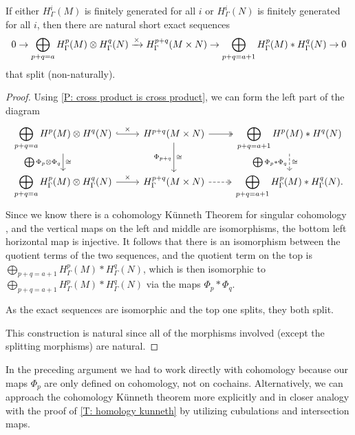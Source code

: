 \begin{theorem}\label{T: cohomology kunneth}
	If either $H^i_\Gamma(M)$ is finitely generated for all $i$ or $H^i_\Gamma(N)$ is finitely generated for all $i$, then there are natural short exact sequences
	\[
	0 \to \bigoplus_{p+q = a}H^p_\Gamma(M) \otimes H^q_\Gamma(N) \xrightarrow{\times} H^{p+q}_\Gamma(M \times N) \to \bigoplus_{p+q = a+1}H^p_\Gamma(M)* H^q_\Gamma(N) \to 0
	\]
	that split (non-naturally).
\end{theorem}

\begin{proof}
	Using \cref{P: cross product is cross product}, we can form the left part of the diagram
	\[
	\begin{tikzcd}
	\displaystyle\bigoplus_{p+q = a}H^p(M) \otimes H^q(N) \arrow[r,"\times",hook]\arrow[d,"\bigoplus \Phi_p \otimes \Phi_q"',"\cong"]& H^{p+q}(M \times N) \arrow[r,twoheadrightarrow]\arrow[d,"\Phi_{p+q}"',"\cong"]&\displaystyle\bigoplus_{p+q = a+1}H^p(M)* H^q(N) \arrow[d,dashed,"\bigoplus \Phi_p * \Phi_q"',"\cong"]\\
	\displaystyle\bigoplus_{p+q = a}H^p_\Gamma(M) \otimes H^q_\Gamma(N) \arrow[r,"\times"]& H^{p+q}_\Gamma(M \times N) \arrow[r,dashed,twoheadrightarrow]& \displaystyle\bigoplus_{p+q = a+1}H^p_\Gamma(M)* H^q_\Gamma(N).
	\end{tikzcd}
	\]
	Since we know there is a cohomology K\"unneth Theorem for singular cohomology \cite[Theorem 60.5]{Mun84}, and the vertical maps on the left and middle are isomorphisms, the bottom left horizontal map is injective.
	It follows that there is an isomorphism between the quotient terms of the two sequences, and the quotient term on the top is $\displaystyle\bigoplus_{p+q = a+1}H^p_\Gamma(M)* H^q_\Gamma(N)$, which is then isomorphic to $\displaystyle\bigoplus_{p+q = a+1}H^p_\Gamma(M)* H^q_\Gamma(N)$ via the maps $\Phi_p*\Phi_q$.

	As the exact sequences are isomorphic and the top one splits, they both split.

	This construction is natural since all of the morphisms involved (except the splitting morphisms) are natural.
\end{proof}

In the preceding argument we had to work directly with cohomology because our maps $\Phi_p$ are only defined on cohomology, not on cochains.
Alternatively, we can approach the cohomology K\"unneth theorem more explicitly and in closer analogy with the proof of \cref{T: homology kunneth} by utilizing cubulations and intersection maps.

